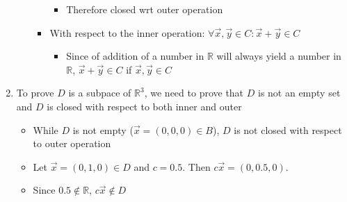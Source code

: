 \documentclass[12pt]{article}
\begin{document}
\begin{enumerate}[label=(\alph*)]
\begin{enumerate}[label=\arabic*.]
\begin{itemize}
\begin{itemize}
                                        \item Therefore closed wrt outer operation
                                    \end{itemize} 
                                \item With respect to the inner operation: $\forall \vec{x}, \vec{y} \in C : \vec{x} + \vec{y} \in C$
                                    \begin{itemize}
                                        \item Since of addition of a number in $\mathbb{R}$ will always yield a number in $\mathbb{R}$, $\vec{x} + \vec{y} \in C$ if $\vec{x}, \vec{y} \in C$
                                    \end{itemize}
                            \end{itemize} 
                    \end{enumerate}
                \item To prove $D$ is a subpace of $\mathbb{R}^3$, we need to prove that $D$ is not an empty set and $D$ is closed with respect to both inner and outer
                    \begin{itemize}
                        \item While $D$ is not empty ($\vec{x} = (0, 0, 0) \in B$), $D$ is not closed with respect to outer operation
                        \item Let $\vec{x} = (0, 1, 0) \in D$ and $c = 0.5$. Then $c\vec{x} = (0, 0.5, 0)$.
                        \item Since $0.5 \notin \mathbb{R}$, $c\vec{x} \notin D$
                    \end{itemize}
            \end{enumerate}
        \newpage
\end{document}
